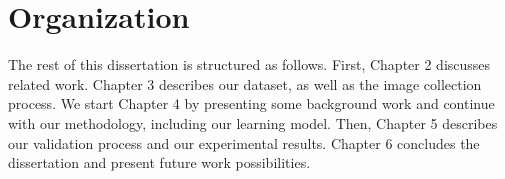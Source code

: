 \section{Organization}

The rest of this dissertation is structured as follows. First, Chapter 2 discusses related work. Chapter 3 describes our dataset, as well as the image collection process. We start Chapter 4 by presenting some background work and continue with our methodology, including our learning model. Then, Chapter 5 describes our validation process and our experimental results. Chapter 6 concludes the dissertation and present future work possibilities.